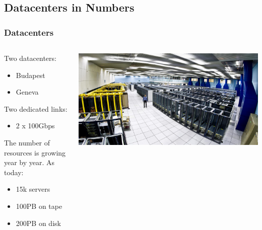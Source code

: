 \documentclass{beamer}
\begin{document}
\subsection{Datacenters in Numbers}
\begin{frame}
    \frametitle{Datacenters}
    \begin{minipage}[t]{0.95\textwidth}
        \begin{columns}
            \begin{column}{0.5\textwidth}
                Two datacenters:
                \begin{itemize}
                    \item Budapest
                    \item Geneva
                \end{itemize}
                Two dedicated links:
                \begin{itemize}
                    \item 2 x 100Gbps
                \end{itemize}
                \vspace{0.2in} 
                The number of resources is growing year by year.
                As today:
                \begin{itemize}
                    \item 15k servers
                    \item 100PB on tape
                    \item 200PB on disk
                \end{itemize}
            \end{column}
            \begin{column}{0.5\textwidth}
                \includegraphics[width=1.1\textwidth]{DC_overview.png}
                \vspace{0.2in} 

\end{column}
\end{columns}
\end{minipage}
\end{frame}
\end{document}
